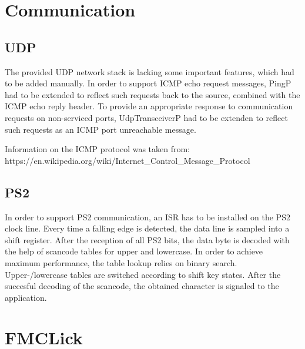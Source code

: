 \documentclass[12pt,a4paper,titlepage,oneside]{article}
\begin{document}
\section{Communication}

\subsection{UDP}

The provided UDP network stack is lacking some important features, which had
to be added manually. In order to support ICMP echo request messages, PingP
had to be extended to reflect such requests back to the source, combined with
the ICMP echo reply header. To provide an appropriate response to communication
requests on non-serviced ports, UdpTransceiverP had to be extenden to reflect
such requests as an ICMP port unreachable message.

Information on the ICMP protocol was taken from: https://en.wikipedia.org/wiki/Internet\_Control\_Message\_Protocol

\subsection{PS2}

In order to support PS2 communication, an ISR has to be installed on the PS2
clock line. Every time a falling edge is detected, the data line is sampled
into a shift register. After the reception of all PS2 bits, the data byte is 
decoded with the help of scancode tables for upper and lowercase. In order
to achieve maximum performance, the table lookup relies on binary search.
Upper-/lowercase tables are switched according to shift key states. After
the succesful decoding of the scancode, the obtained character is signaled
to the application.

\section{FMCLick}
\end{document}
